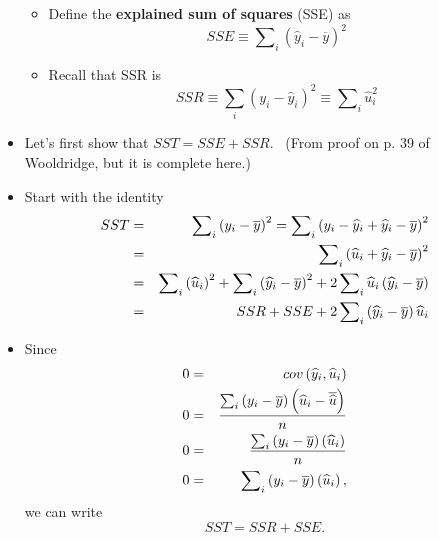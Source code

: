 \documentclass[11pt]{article}
\begin{document}
\begin{itemize}
\begin{itemize}
\item Define the \textbf{explained sum of squares} (SSE) as%
\begin{equation*}
SSE\equiv \sum\nolimits_{i}\left( \widehat{y}_{i}-\overline{y}\right) ^{2}
\end{equation*}

\item Recall that SSR is%
\begin{equation*}
SSR\equiv \sum_{i}\left( y_{i}-\widehat{y}_{i}\right) ^{2}\equiv
\sum\nolimits_{i}\widehat{u}_{i}^{2}
\end{equation*}
\end{itemize}

\item Let's first show that $SST=SSE+SSR.$ \ (From proof on p. 39 of
Wooldridge, but it is complete here.)

\item Start with the identity%
\begin{eqnarray*}
SST &=&\sum\nolimits_{i}\left( y_{i}-\overline{y}\right)
^{2}=\sum\nolimits_{i}\left( y_{i}-\widehat{y}_{i}+\widehat{y}_{i}-\overline{%
y}\right) ^{2} \\
&=&\sum\nolimits_{i}\left( \widehat{u}_{i}+\widehat{y}_{i}-\overline{y}%
\right) ^{2} \\
&=&\sum\nolimits_{i}\left( \widehat{u}_{i}\right)
^{2}+\sum\nolimits_{i}\left( \widehat{y}_{i}-\overline{y}\right)
^{2}+2\sum\nolimits_{i}\widehat{u}_{i}\left( \widehat{y}_{i}-\overline{y}%
\right) \\
&=&SSR+SSE+2\sum\nolimits_{i}\left( \widehat{y}_{i}-\overline{y}\right) 
\widehat{u}_{i}
\end{eqnarray*}

\item Since%
\begin{eqnarray*}
0 &=&cov\left( \widehat{y}_{i},\widehat{u}_{i}\right) \\
0 &=&\frac{\sum\nolimits_{i}\left( y_{i}-\overline{y}\right) \left( \widehat{%
u}_{i}-\overline{\widehat{u}}\right) }{n} \\
0 &=&\frac{\sum\nolimits_{i}\left( y_{i}-\overline{y}\right) \left( \widehat{%
u}_{i}\right) }{n} \\
0 &=&\sum\nolimits_{i}\left( y_{i}-\overline{y}\right) \left( \widehat{u}%
_{i}\right) ,
\end{eqnarray*}%
we can write%
\begin{equation*}
SST=SSR+SSE.
\end{equation*}
\end{itemize}
\end{document}
